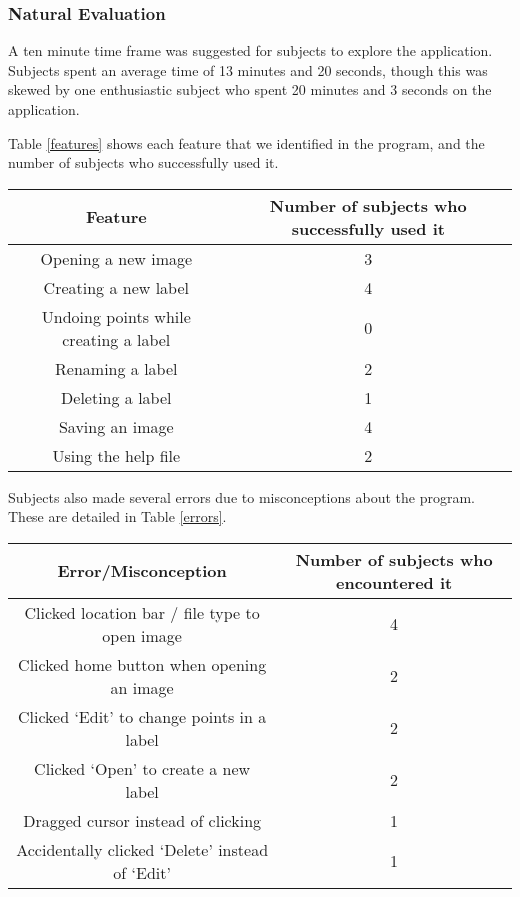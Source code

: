 \documentclass[11pt,twocolumn]{article}
\begin{document}
\subsubsection{Natural Evaluation}

A ten minute time frame was suggested for subjects to explore the application.
Subjects spent an average time of 13 minutes and 20 seconds, though this was
skewed by one enthusiastic subject who spent 20 minutes and 3 seconds on the
application.

Table \ref{features} shows each feature that we identified in the program, and
the number of subjects who successfully used it.

\begin{table*}
\begin{tabular}{|c|c|}
\hline
Feature & Number of subjects who successfully used it \\
\hline
Opening a new image & 3 \\
Creating a new label & 4 \\
Undoing points while creating a label & 0 \\
Renaming a label & 2 \\
Deleting a label & 1 \\
Saving an image & 4 \\
Using the help file & 2 \\
\hline
\end{tabular}
\caption{The number of subjects who used each feature during our Natural Evaluation.}
\label{features}
\end{table*}
 
Subjects also made several errors due to misconceptions about the program.
These are detailed in Table \ref{errors}.

\begin{table*}
\begin{tabular}{|c|c|}
\hline
Error/Misconception & Number of subjects who encountered it \\
\hline
Clicked location bar / file type to open image & 4 \\
Clicked home button when opening an image & 2 \\
Clicked `Edit' to change points in a label & 2 \\
Clicked `Open' to create a new label & 2 \\
Dragged cursor instead of clicking & 1 \\
Accidentally clicked `Delete' instead of `Edit' & 1 \\
\hline
\end{tabular}
\caption{Mistakes made by subjects during Natural Evaluation.}
\label{errors}
\end{table*}
\end{document}
